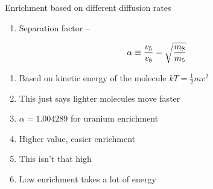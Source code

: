 \documentclass[aspectratio=1610,pdftex,dvipsnames,compress,xcolor={dvipsnames}]{beamer}
\begin{document}
\begin{frame}{Enrichment based on different diffusion rates}
    \begin{enumerate}[topsep=0pt,itemsep=18pt,leftmargin=*,label=(\arabic*)]
        \item[]Separation factor --
    \end{enumerate}

    \vspace*{\fill}

    \begin{equation}
        \LARGE
        \alpha \equiv \frac{v_5}{v_8} = \sqrt{\frac{m_8}{m_5}}
    \end{equation}
    
    \vspace*{\fill}

    \begin{enumerate}[topsep=0pt,itemsep=11pt,leftmargin=*,label=(\arabic*)]
        \item[]Based on kinetic energy of the molecule $kT = \frac{1}{2}mv^2$
        \item[]This just says lighter molecules move faster
        \item[]$\alpha = 1.004289$ for uranium enrichment
        \item[]Higher value, easier enrichment
        \item[]This isn't that high
        \item[]Low enrichment takes a lot of energy
    \end{enumerate}
\end{frame}
\end{document}
